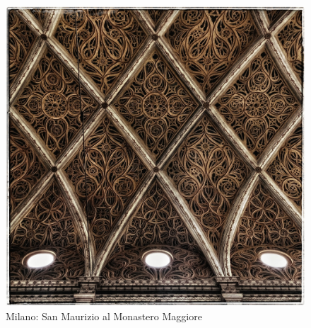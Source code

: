 \documentclass[nols]{tufte-handout}
\begin{document}
\begin{figure}[!b]
  \includegraphics{thumb-lesson_XXI.jpeg}
  \caption{Milano: San Maurizio al Monastero Maggiore}
  \label{fig:textfig}
\end{figure}

 


\end{document}
